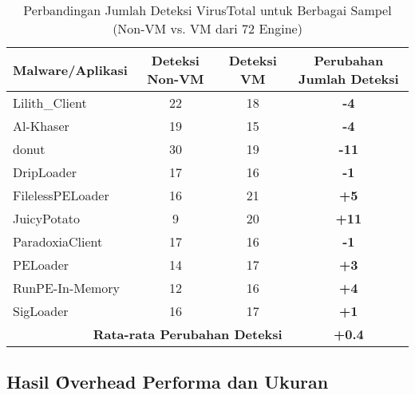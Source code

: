 \begin{table}[H]
    \centering
    \caption{Perbandingan Jumlah Deteksi VirusTotal untuk Berbagai Sampel (Non-VM vs. VM dari 72 Engine)}
    \label{tab:virustotal_jurnal_ui_ana}
    \fontsize{12}{12}\selectfont %
    \begin{tabular}{@{}lccc@{}}
        \toprule
        \textbf{Malware/Aplikasi} & \textbf{Deteksi Non-VM} & \textbf{Deteksi VM} & \textbf{Perubahan Jumlah Deteksi} \\
        \midrule
        Lilith\_Client    & 22 & 18 & \textbf{-4} \\
        Al-Khaser         & 19 & 15 & \textbf{-4} \\
        donut             & 30 & 19 & \textbf{-11} \\
        DripLoader        & 17 & 16 & \textbf{-1} \\
        FilelessPELoader  & 16 & 21 & \textbf{+5} \\
        JuicyPotato       & 9  & 20 & \textbf{+11} \\
        ParadoxiaClient   & 17 & 16 & \textbf{-1} \\
        PELoader          & 14 & 17 & \textbf{+3} \\
        RunPE-In-Memory   & 12 & 16 & \textbf{+4} \\
        SigLoader         & 16 & 17 & \textbf{+1} \\
        \midrule
        \multicolumn{3}{r}{\textbf{Rata-rata Perubahan Deteksi}} & \textbf{+0.4} \\
        \bottomrule
    \end{tabular}
\end{table}

\subsection{Hasil \f{Overhead} Performa dan Ukuran}

